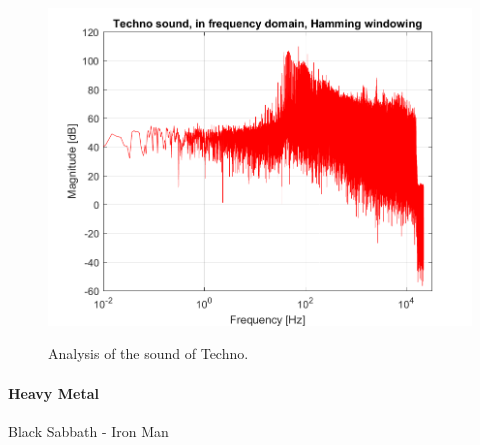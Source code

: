 \begin{figure}[htb]
	{\includegraphics[width=0.45\linewidth]{code/Techno_figure5.png}}
	\caption{Analysis of the sound of Techno.}\label{fig:techno}
\end{figure}

\paragraph{Heavy Metal}
Black Sabbath - Iron Man

